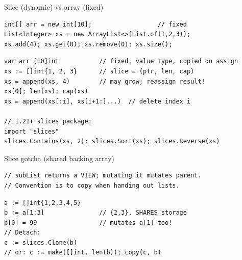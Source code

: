 \documentclass[10pt]{article}
\begin{document}
\bigskip


\begin{construct}{Slice (dynamic) vs array (fixed)}
\noindent
\begin{minipage}[t]{0.485\linewidth}
\begin{lstlisting}[style=java, title=Java]
int[] arr = new int[10];                  // fixed
List<Integer> xs = new ArrayList<>(List.of(1,2,3));
xs.add(4); xs.get(0); xs.remove(0); xs.size();
\end{lstlisting}
\end{minipage}\hfill
\begin{minipage}[t]{0.485\linewidth}
\begin{lstlisting}[style=go, title=Go]
var arr [10]int           // fixed, value type, copied on assign
xs := []int{1, 2, 3}      // slice = (ptr, len, cap)
xs = append(xs, 4)        // may grow; reassign result!
xs[0]; len(xs); cap(xs)
xs = append(xs[:i], xs[i+1:]...)  // delete index i

// 1.21+ slices package:
import "slices"
slices.Contains(xs, 2); slices.Sort(xs); slices.Reverse(xs)
\end{lstlisting}
\end{minipage}
\end{construct}

\begin{construct}{Slice gotcha (shared backing array)}
\noindent
\begin{minipage}[t]{0.485\linewidth}
\begin{lstlisting}[style=java, title=Java]
// subList returns a VIEW; mutating it mutates parent.
// Convention is to copy when handing out lists.
\end{lstlisting}
\end{minipage}\hfill
\begin{minipage}[t]{0.485\linewidth}
\begin{lstlisting}[style=go, title=Go]
a := []int{1,2,3,4,5}
b := a[1:3]               // {2,3}, SHARES storage
b[0] = 99                 // mutates a[1] too!
// Detach:
c := slices.Clone(b)
// or: c := make([]int, len(b)); copy(c, b)
\end{lstlisting}
\end{minipage}
\end{construct}
\end{document}
